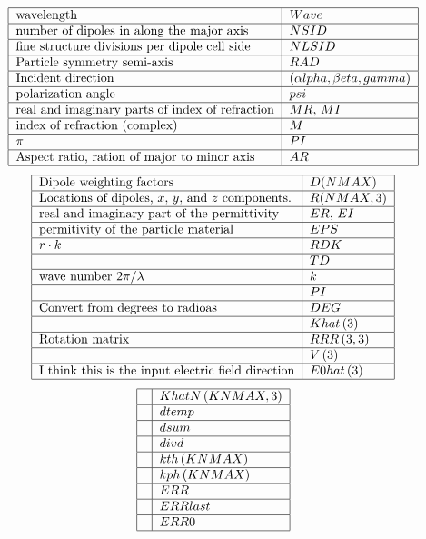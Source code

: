 \documentclass{article}
\begin{document}
\[
\begin{tabular}{|l|l|}
\hline
wavelength & $Wave$ \\ \hline
number of dipoles in along the major axis & $NSID$ \\ \hline
fine structure divisions per dipole cell side & $NLSID$ \\ \hline
Particle symmetry semi-axis & $RAD$ \\ \hline
Incident direction & $\left( \alpha lpha,\beta eta,gamma\right) $ \\ \hline
polarization angle & $psi$ \\ \hline
real and imaginary parts of index of refraction & $MR,$ $MI$ \\ \hline
index of refraction (complex) & $M$ \\ \hline
$\pi $ & $PI$ \\ \hline
Aspect ratio, ration of major to minor axis & $AR$ \\ \hline
\end{tabular}%
\]%
\[
\begin{tabular}{|l|l|}
\hline
Dipole weighting factors & $D(NMAX)$ \\ \hline
Locations of dipoles, $x,$ $y,$ and $z$ components. & $R(NMAX,3)$ \\ \hline
real and imaginary part of the permittivity & $ER,$ $EI$ \\ \hline
permitivity of the particle material & $EPS$ \\ \hline
$r\cdot k$ & $RDK$ \\ \hline
& $TD$ \\ \hline
wave number $2\pi /\lambda $ & $k$ \\ \hline
& $PI$ \\ \hline
Convert from degrees to radioas & $DEG$ \\ \hline
& $Khat\left( 3\right) $ \\ \hline
Rotation matrix & $RRR\left( 3,3\right) $ \\ \hline
& $V\left( 3\right) $ \\ \hline
I think this is the input electric field direction & $E0hat\left( 3\right) $
\\ \hline
\end{tabular}%
\]%
\[
\begin{tabular}{|l|l|}
\hline
& $KhatN\left( KNMAX,3\right) $ \\ \hline
& $dtemp$ \\ \hline
& $dsum$ \\ \hline
& $divd$ \\ \hline
& $kth\left( KNMAX\right) $ \\ \hline
& $kph\left( KNMAX\right) $ \\ \hline
& $ERR$ \\ \hline
& $ERRlast$ \\ \hline
& $ERR0$ \\ \hline
\end{tabular}%
\]%
\end{document}
